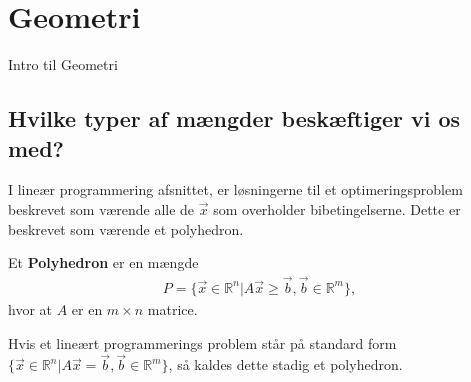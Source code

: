 \chapter{Geometri}
Intro til Geometri
\section{Hvilke typer af mængder beskæftiger vi os med?}
I lineær programmering afsnittet, er løsningerne til et optimeringsproblem beskrevet som værende alle de $\vec{x}$ som overholder bibetingelserne. Dette er beskrevet som værende et polyhedron.
\begin{defn} [Polyhedron]
Et \textbf{Polyhedron} er en mængde 
\begin{align*}
 P =\{ \vec{x} \in \mathds{R}^n | A \vec{x} \geq \vec{b}, \vec{b}\in \mathds{R}^m\},
\end{align*}
hvor at $A$ er en $m \times n$ matrice.
\end{defn}
Hvis et lineært programmerings problem står på standard form $\{ \vec{x} \in \mathds{R}^n | A \vec{x} = \vec{b}, \vec{b}\in \mathds{R}^m\}$, så kaldes dette stadig et polyhedron.\\

